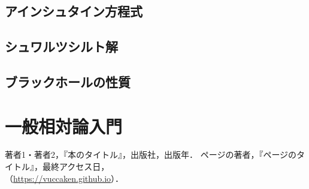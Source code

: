 \documentclass[uplatex,dvipdfmx]{vkaishi}
\begin{document}
\subsection{アインシュタイン方程式}

\subsection{シュワルツシルト解}

\subsection{ブラックホールの性質}








\section{一般相対論入門}


\begin{thebibliography}{99}
   著者1・著者2，『本のタイトル』，出版社，出版年．
   ページの著者，『ページのタイトル』，最終アクセス日，\\（\url{https://vuccaken.github.io}）．
\end{thebibliography}
\end{document}
